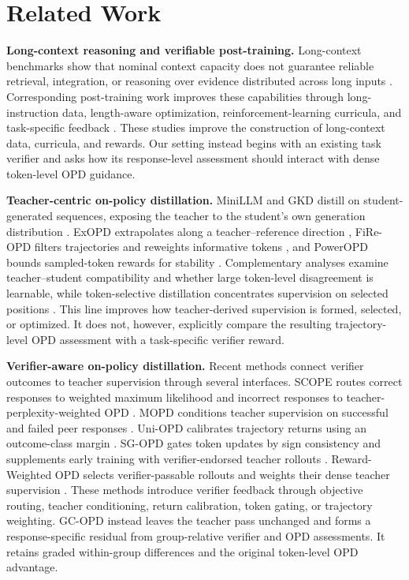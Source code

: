 \section{Related Work}

\textbf{Long-context reasoning and verifiable post-training.}
Long-context benchmarks show that nominal context capacity does not guarantee reliable retrieval, integration, or reasoning over evidence distributed across long inputs \citep{bai2024longbench,hsieh2024ruler,liu2024lost,goldman2024really,pmlr-v267-modarressi25a}. Corresponding post-training work improves these capabilities through long-instruction data, length-aware optimization, reinforcement-learning curricula, and task-specific feedback \citep{bai2024longalign,wan2025qwenlong,wang2026loongrl,chen2026longrlvr,zhang2025longreward}. These studies improve the construction of long-context data, curricula, and rewards. Our setting instead begins with an existing task verifier and asks how its response-level assessment should interact with dense token-level OPD guidance.

\textbf{Teacher-centric on-policy distillation.}
MiniLLM and GKD distill on student-generated sequences, exposing the teacher to the student's own generation distribution \citep{gu2024minillm,agarwal2024policy}. ExOPD extrapolates along a teacher--reference direction \citep{yang2026learning}, FiRe-OPD filters trajectories and reweights informative tokens \citep{li2026filter}, and PowerOPD bounds sampled-token rewards for stability \citep{zhao2026poweropd}. Complementary analyses examine teacher--student compatibility and whether large token-level disagreement is learnable, while token-selective distillation concentrates supervision on selected positions \citep{li2026rethinking,wang2026not,kim2026explain}. This line improves how teacher-derived supervision is formed, selected, or optimized. It does not, however, explicitly compare the resulting trajectory-level OPD assessment with a task-specific verifier reward.

\textbf{Verifier-aware on-policy distillation.}
Recent methods connect verifier outcomes to teacher supervision through several interfaces. SCOPE routes correct responses to weighted maximum likelihood and incorrect responses to teacher-perplexity-weighted OPD \citep{zheng2026scope}. MOPD conditions teacher supervision on successful and failed peer responses \citep{yu2026multi}. Uni-OPD calibrates trajectory returns using an outcome-class margin \citep{hou2026uni}. SG-OPD gates token updates by sign consistency and supplements early training with verifier-endorsed teacher rollouts \citep{xu2026sg}. Reward-Weighted OPD selects verifier-passable rollouts and weights their dense teacher supervision \citep{zou2026reward}. These methods introduce verifier feedback through objective routing, teacher conditioning, return calibration, token gating, or trajectory weighting. GC-OPD instead leaves the teacher pass unchanged and forms a response-specific residual from group-relative verifier and OPD assessments. It retains graded within-group differences and the original token-level OPD advantage.


